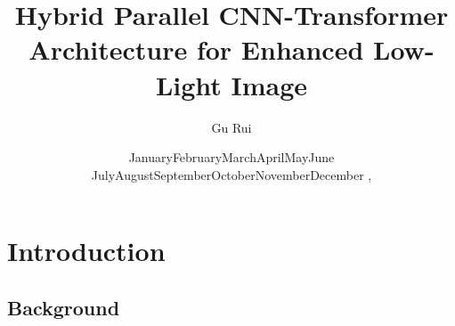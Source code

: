 \documentclass[CJK,aspectratio=169]{beamer}  %
\begin{document}
	
	\title{Hybrid Parallel CNN-Transformer Architecture for Enhanced Low-Light Image}
	\author[Gu Rui (LZU)]{Gu Rui }
	
	\newcommand{\monthname}[1][\the\month]{%
		\ifcase#1\or
		January\or February\or March\or April\or May\or June\or
		July\or August\or September\or October\or November\or December\fi}
		
	\renewcommand{\today}{\monthname[\the\month] \the\day, \the\year}
	\renewcommand{\figurename}{Figure}
	\renewcommand{\tablename}{Table}
	\renewcommand{\refname}{References}
	\date{\today}
	
	\begin{frame}
		\titlepage
	\end{frame}
	
	\begin{frame}
		\begin{multicols}{2}
			\small \tableofcontents
		\end{multicols}
	\end{frame}
	
%		
%			
	
	\section{Introduction}
	
	\subsection{Background}
	
\end{document}
